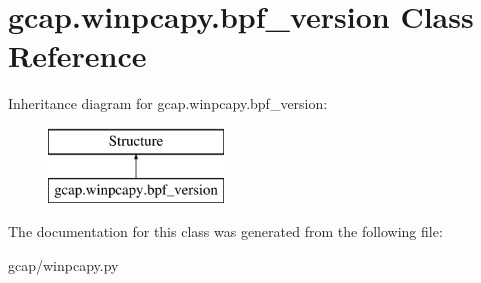 \hypertarget{classgcap_1_1winpcapy_1_1bpf__version}{}\section{gcap.\+winpcapy.\+bpf\+\_\+version Class Reference}
\label{classgcap_1_1winpcapy_1_1bpf__version}
Inheritance diagram for gcap.\+winpcapy.\+bpf\+\_\+version\+:\begin{figure}[H]
\begin{center}
\leavevmode
\includegraphics[height=2.000000cm]{d9/d30/classgcap_1_1winpcapy_1_1bpf__version}
\end{center}
\end{figure}


The documentation for this class was generated from the following file\+:\begin{DoxyCompactItemize}
\item 
gcap/winpcapy.\+py\end{DoxyCompactItemize}
